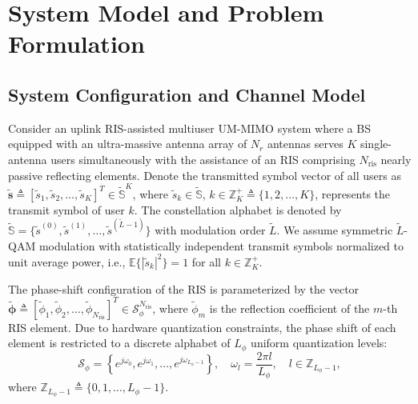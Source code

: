 \documentclass[conference]{IEEEtran}
\begin{document}
\section{System Model and Problem Formulation}

\subsection{System Configuration and Channel Model}
Consider an uplink RIS-assisted multiuser UM-MIMO system where a BS equipped with an ultra-massive antenna array of $N_r$ antennas serves $K$ single-antenna users simultaneously with the assistance of an RIS comprising $N_{\mathrm{ris}}$ nearly passive reflecting elements. Denote the transmitted symbol vector of all users as $\tilde{\mathbf{s}} \triangleq [\tilde{s}_1, \tilde{s}_2, \dots, \tilde{s}_K]^T \in \tilde{\mathbb{S}}^K$, where $\tilde{s}_k \in \tilde{\mathbb{S}}$, $k \in \mathbb{Z}_K^+ \triangleq \{1, 2, \dots, K\}$, represents the transmit symbol of user $k$. The constellation alphabet is denoted by $\tilde{\mathbb{S}} = \{\tilde{s}^{(0)}, \tilde{s}^{(1)}, \dots, \tilde{s}^{(\tilde{L}-1)}\}$ with modulation order $\tilde{L}$. We assume symmetric $\tilde{L}$-QAM modulation with statistically independent transmit symbols normalized to unit average power, i.e., $\mathbb{E}\{|\tilde{s}_k|^2\} = 1$ for all $k \in \mathbb{Z}_K^+$.

The phase-shift configuration of the RIS is parameterized by the vector $\tilde{\boldsymbol{\phi}} \triangleq [\tilde{\phi}_1, \tilde{\phi}_2, \dots, \tilde{\phi}_{N_{\mathrm{ris}}}]^T \in \mathcal{S}_{\phi}^{N_{\mathrm{ris}}}$, where $\tilde{\phi}_m$ is the reflection coefficient of the $m$-th RIS element. Due to hardware quantization constraints, the phase shift of each element is restricted to a discrete alphabet of $L_{\phi}$ uniform quantization levels:
\begin{equation}
	\mathcal{S}_{\phi} = \left\{e^{j\omega_0}, e^{j\omega_1}, \dots, e^{j\omega_{L_{\phi}-1}}\right\}, \quad \omega_l = \frac{2\pi l}{L_{\phi}}, \quad l \in \mathbb{Z}_{L_{\phi}-1},
\end{equation}
where $\mathbb{Z}_{L_{\phi}-1} \triangleq \{0, 1, \dots, L_{\phi}-1\}$.
\end{document}
